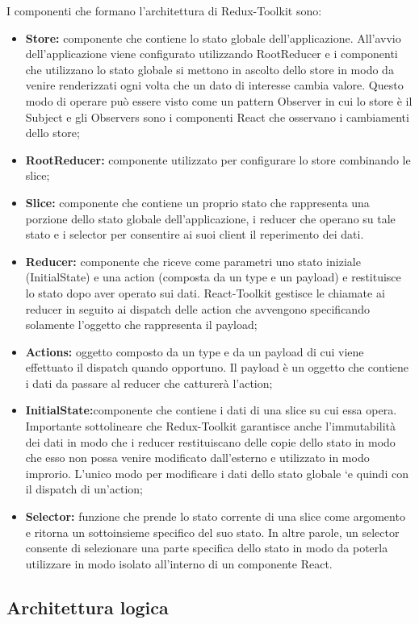 I componenti che formano l’architettura di Redux-Toolkit sono:
\begin{itemize}
    \item \textbf{Store:} componente che contiene lo stato globale dell’applicazione.
    All’avvio dell’applicazione viene configurato utilizzando RootReducer e i componenti che utilizzano
    lo stato globale si mettono in ascolto dello store in modo da venire renderizzati ogni volta che un dato
    di interesse cambia valore. Questo modo di operare può essere visto come un pattern Observer in
    cui lo store è il Subject e gli Observers sono i componenti React che osservano i cambiamenti dello store;
    \item \textbf{RootReducer:} componente utilizzato per configurare lo store combinando le slice;
    \item \textbf{Slice:} componente che contiene un proprio stato che rappresenta una porzione dello stato globale
    dell’applicazione, i reducer che operano su tale stato e i selector per consentire ai suoi client il
    reperimento dei dati.
    \item \textbf{Reducer:} componente che riceve come parametri uno stato iniziale (InitialState) e una action
    (composta da un type e un payload) e restituisce lo stato dopo aver operato sui dati. 
    React-Toolkit gestisce le chiamate ai reducer in seguito ai dispatch delle action che avvengono
    specificando solamente l’oggetto che rappresenta il payload;
    \item \textbf{Actions:} oggetto composto da un type e da un payload di cui viene effettuato il dispatch quando
    opportuno. Il payload è un oggetto che contiene i dati da passare al reducer che catturerà l’action;
    \item \textbf{InitialState:}componente che contiene i dati di una slice su cui essa opera.
    Importante sottolineare che Redux-Toolkit garantisce anche l’immutabilità
    dei dati in modo che i reducer restituiscano delle copie dello stato in modo che esso non possa venire
    modificato dall’esterno e utilizzato in modo improrio.
    L’unico modo per modificare i dati dello stato globale `e quindi con il dispatch di un’action;
    \item \textbf{Selector:} funzione che prende lo stato corrente di una slice come argomento e ritorna un sottoinsieme
    specifico del suo stato. In altre parole, un selector consente di selezionare una parte specifica
    dello stato in modo da poterla utilizzare in modo isolato all’interno di un componente React.
\end{itemize}

\subsection{Architettura logica}
